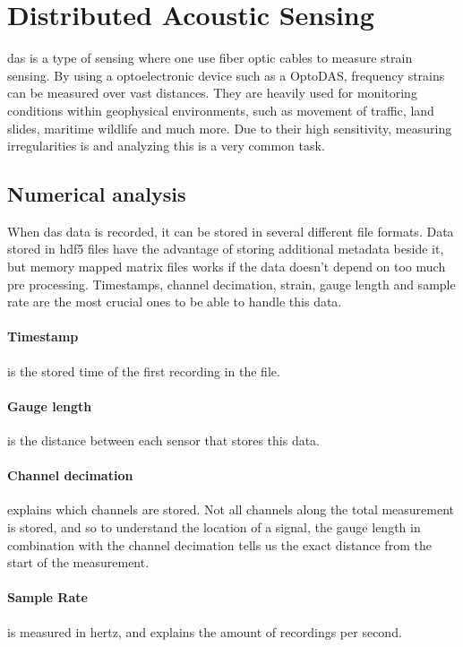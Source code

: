\section{Distributed Acoustic Sensing}
\label{back:das}

\acrfull{das} is a type of sensing where one use fiber optic cables to measure strain sensing. By using a optoelectronic device such as a OptoDAS, frequency strains can be measured over vast distances. They are heavily used for monitoring conditions within geophysical environments, such as movement of traffic, land slides, maritime wildlife and much more. Due to their high sensitivity, measuring irregularities is and analyzing this is a very common task. \\

\subsection{Numerical analysis}

When \acrshort{das} data is recorded, it can be stored in several different file formats. Data stored in \acrshort{hdf5} files have the advantage of storing additional metadata beside it, but memory mapped matrix files works if the data doesn't depend on too much pre processing. Timestamps, channel decimation, strain, gauge length and sample rate are the most crucial ones to be able to handle this data. 

\paragraph{Timestamp} is the stored time of the first recording in the file.

\paragraph{Gauge length} is the distance between each sensor that stores this data.

\paragraph{Channel decimation} explains which channels are stored. Not all channels along the total measurement is stored, and so to understand the location of a signal, the gauge length in combination with the channel decimation tells us the exact distance from the start of the measurement.

\paragraph{Sample Rate} is measured in hertz, and explains the amount of recordings per second.

